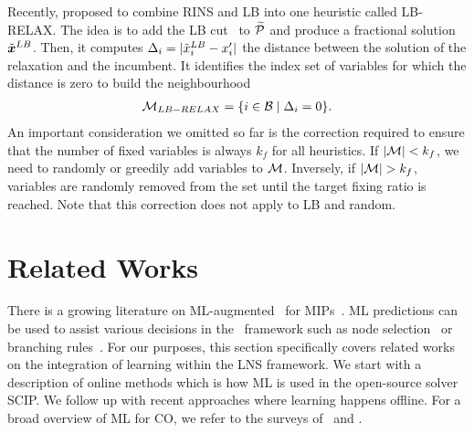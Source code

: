 \documentclass[3p, authoryear, times]{elsarticle}
\begin{document}

Recently, \cite{huang_local_2023} proposed to combine RINS and LB into one heuristic called LB-RELAX. The idea is to add the LB cut~ to $\widetilde{\mathcal{P}}$ and produce a fractional solution $\tilde{\boldsymbol{x}}^{LB}$. Then, it computes $\Delta_i = |\tilde{x}^{LB}_i - x_i'|$ the distance between the solution of the relaxation and the incumbent. It identifies the index set of variables for which the distance is zero to build the neighbourhood
\begin{align}
    \mathcal{M}_{LB-RELAX} = \{ i \in \mathcal{B} \mid  \Delta_i = 0 \}. 
\end{align}
An important consideration we omitted so far is the correction required to ensure that the number of fixed variables is always $k_f$ for all heuristics. If $|\mathcal{M}| < k_f$, we need to randomly or greedily \citep{huang_local_2023}  add  variables to $\mathcal{M}$. Inversely, if $|\mathcal{M}| > k_f$, variables are randomly removed from the set until the target fixing ratio is reached. Note that this correction does not apply to LB and random. 


\section{Related Works} \label{sec:lns:related_works}

There is a growing literature on ML-augmented \bnb\ for MIPs~\citep{scavuzzo_machine_2024}. ML predictions can be used to assist various decisions in the \bnb\ framework such as node selection~\citep{khalil_mip-gnn_2022} or branching rules~\citep{khalil_learning_2016}. For our purposes, this section specifically covers related works on the integration of learning within the LNS framework. We start with a description of online methods which is how ML is used in the open-source solver SCIP.  We follow up with recent approaches where learning happens offline. For a broad overview of ML for CO, we refer to the surveys of~\cite{bengio_machine_2021} and \cite{kotary_learning_2021}. 
\end{document}
